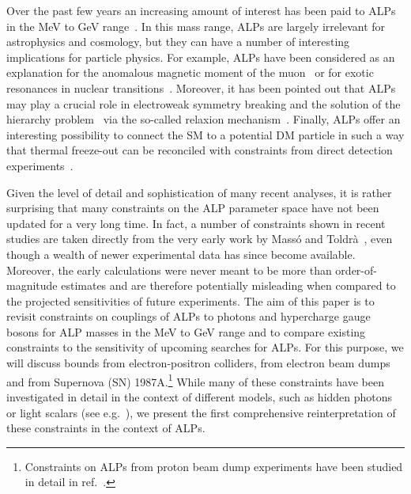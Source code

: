 \documentclass[11pt,a4paper]{article}
\begin{document}
Over the past few years an increasing amount of interest has been paid to ALPs in the MeV to GeV range~\cite{Mimasu:2014nea,Dolan:2014ska,Jaeckel:2015jla,Dobrich:2015jyk,Izaguirre:2016dfi,Knapen:2016moh,Brivio:2017ije,Bauer:2017nlg,Choi:2017gpf,Bauer:2017ris}. In this mass range, ALPs are largely irrelevant for astrophysics and cosmology, but they can have a number of interesting implications for particle physics. For example, ALPs have been considered as an explanation for the anomalous magnetic moment of the muon~\cite{Chang:2000ii,Marciano:2016yhf,Bauer:2017nlg} or for exotic resonances in nuclear transitions~\cite{Ellwanger:2016wfe}. Moreover, it has been pointed out that ALPs may play a crucial role in electroweak symmetry breaking and the solution of the hierarchy problem~\cite{Flacke:2016szy} via the so-called relaxion mechanism~\cite{Graham:2015cka}. Finally, ALPs offer an interesting possibility to connect the SM to a potential DM particle in such a way that thermal freeze-out can be reconciled with constraints from direct detection experiments~\cite{Nomura:2008ru,Boehm:2014hva,Dolan:2014ska}.

Given the level of detail and sophistication of many recent analyses, it is rather surprising that many constraints on the ALP parameter space have not been updated for a very long time. In fact, a number of constraints shown in recent studies are taken directly from the very early work by Mass\'{o} and Toldr\`{a}~\cite{Masso:1995tw,Masso:1997ru}, even though a wealth of newer experimental data has since become available. Moreover, the early calculations were never meant to be more than order-of-magnitude estimates and are therefore potentially misleading when compared to the projected sensitivities of future experiments. The aim of this paper is to revisit constraints on couplings of ALPs to photons and hypercharge gauge bosons for ALP masses in the MeV to GeV range and to compare existing constraints to the sensitivity of upcoming searches for ALPs. For this purpose, we will discuss bounds from electron-positron colliders, from electron beam dumps and from Supernova (SN) 1987A.\footnote{Constraints on ALPs from proton beam dump experiments have been studied in detail in ref.~\cite{Dobrich:2015jyk}.} While many of these constraints have been investigated in detail in the context of different models, such as hidden photons or light scalars (see e.g.~\cite{Batell:2009di,Andreas:2012mt,Essig:2013vha,Izaguirre:2013uxa,Batell:2014mga,Krnjaic:2015mbs}), we present the first comprehensive reinterpretation of these constraints in the context of ALPs.
\end{document}
